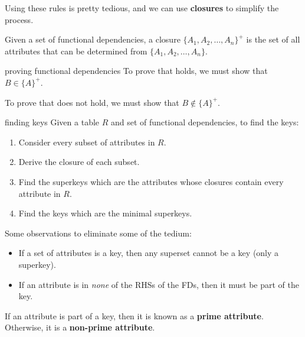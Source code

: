 Using these rules is pretty tedious, and we can use \textbf{closures} to simplify the process.

Given a set of functional dependencies, a closure $\{A_1, A_2, \dots, A_n\}^+$ is the set of all attributes that can be determined from $\{A_1, A_2, \dots, A_n\}$.

\begin{defn}{proving functional dependencies }
    To prove that  holds, we must show that $B \in \{A\}^+$.

    To prove that  does not hold, we must show that $B \notin \{A\}^+$.
\end{defn}

\begin{defn}{finding keys}
    Given a table $R$ and set of functional dependencies, to find the keys:
    \begin{enumerate}
        \item Consider every subset of attributes in $R$.
        \item Derive the closure of each subset.
        \item Find the superkeys which are the attributes whose closures contain every attribute in $R$.
        \item Find the keys which are the minimal superkeys.
    \end{enumerate}

    Some observations to eliminate some of the tedium:
    \begin{itemize}
        \item If a set of attributes is a key, then any superset cannot be a key (only a superkey).
        \item If an attribute is in \textit{none} of the RHSs of the FDs, then it must be part of the key.
    \end{itemize}
\end{defn}

If an attribute is part of a key, then it is known as a \textbf{prime attribute}.
Otherwise, it is a \textbf{non-prime attribute}.